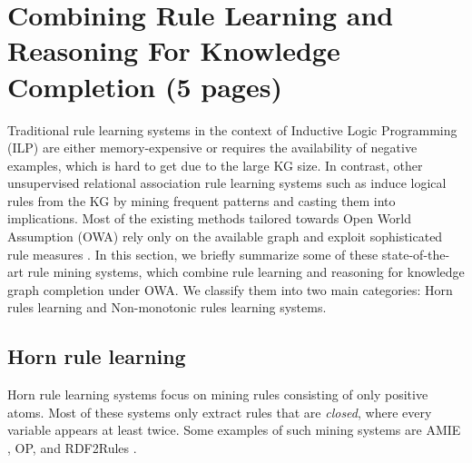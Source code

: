 \section{Combining Rule Learning and Reasoning For Knowledge Completion (5 pages)}
\label{sec:rules_kg_completion}
Traditional rule learning systems in the context of Inductive Logic Programming (ILP) \cite{probfoil,DBLP:conf/ijcai/RaedtDTBV15,DBLP:conf/clima/CorapiSIR11} are either memory-expensive or requires the availability of negative examples, which is hard to get due to the large KG size. In contrast, other unsupervised relational 
association rule learning systems such as \cite{DBLP:conf/esf/GoethalsB02,amie} induce logical rules from the KG by mining frequent patterns and casting them into implications. Most of the  existing methods tailored towards Open World Assumption (OWA) rely only on the available graph and exploit sophisticated rule measures \cite{amie,Chen:2016:OP:2882903.2882954, rumis}.
In this section, we briefly summarize some of these state-of-the-art rule mining systems, which combine rule learning and reasoning for knowledge graph completion under OWA. We classify them into two main categories: Horn rules learning and Non-monotonic rules learning systems.
\subsection{Horn rule learning}
Horn rule learning systems focus on mining rules consisting of only positive atoms. Most of these systems only extract rules that are \emph{closed}, where every variable appears at least twice. Some examples of such mining systems are AMIE \cite{}, OP, \cite{} and RDF2Rules \cite{}.

